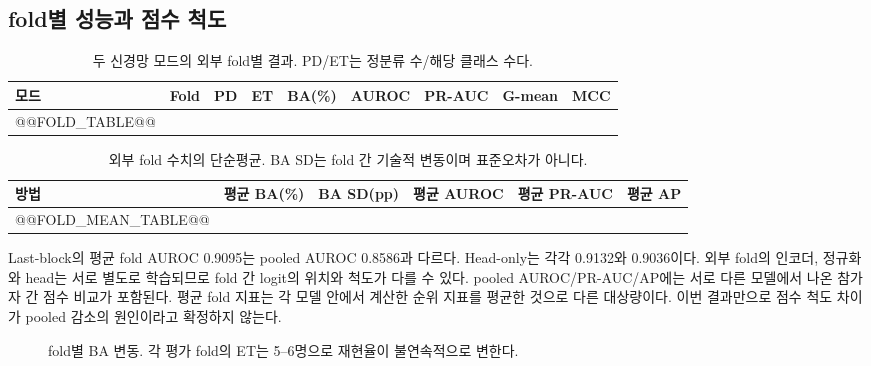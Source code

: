 \documentclass[11pt,a4paper]{article}
\begin{document}
\subsection{fold별 성능과 점수 척도}
\begin{table}[H]\centering\small\setlength{\tabcolsep}{4pt}
\caption{두 신경망 모드의 외부 fold별 결과. PD/ET는 정분류 수/해당 클래스 수다.}
\begin{tabular}{@{}lrrrrrrrr@{}}\toprule
모드 & Fold & PD & ET & BA(\%) & AUROC & PR-AUC & G-mean & MCC\\\midrule
@@FOLD_TABLE@@
\bottomrule\end{tabular}
\end{table}
\begin{table}[H]\centering\small\setlength{\tabcolsep}{4pt}
\caption{외부 fold 수치의 단순평균. BA SD는 fold 간 기술적 변동이며 표준오차가 아니다.}
\begin{tabular}{@{}lrrrrr@{}}\toprule
방법 & 평균 BA(\%) & BA SD(pp) & 평균 AUROC & 평균 PR-AUC & 평균 AP\\\midrule
@@FOLD_MEAN_TABLE@@
\bottomrule\end{tabular}
\end{table}
Last-block의 평균 fold AUROC 0.9095는 pooled AUROC 0.8586과 다르다.
Head-only는 각각 0.9132와 0.9036이다.
외부 fold의 인코더, 정규화와 head는 서로 별도로 학습되므로
fold 간 logit의 위치와 척도가 다를 수 있다.
pooled AUROC/PR-AUC/AP에는 서로 다른 모델에서 나온 참가자 간 점수 비교가 포함된다.
평균 fold 지표는 각 모델 안에서 계산한 순위 지표를 평균한 것으로 다른 대상량이다.
이번 결과만으로 점수 척도 차이가 pooled 감소의 원인이라고 확정하지 않는다.

\begin{figure}[H]\centering
{}
\caption{fold별 BA 변동. 각 평가 fold의 ET는 5--6명으로 재현율이 불연속적으로 변한다.}
\end{figure}
\clearpage
\end{document}
